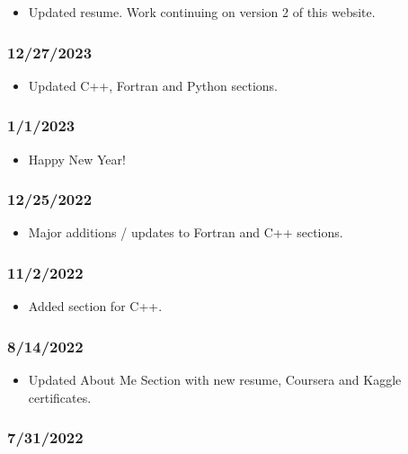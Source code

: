 \begin{itemize}
\item Updated resume. Work continuing on version 2 of this website.
\end{itemize}

\subsubsection{12/27/2023}

\begin{itemize}
\item Updated C++, Fortran and Python sections.
\end{itemize}

\subsubsection{1/1/2023}

\begin{itemize}
\item Happy New Year!
\end{itemize}

\subsubsection{12/25/2022}

\begin{itemize}
\item Major additions / updates to Fortran and C++ sections.
\end{itemize}

\subsubsection{11/2/2022}

\begin{itemize}
\item Added section for C++.
\end{itemize}

\subsubsection{8/14/2022}

\begin{itemize}
\item Updated About Me Section with new resume, Coursera and Kaggle certificates.
\end{itemize}

\subsubsection{7/31/2022}

